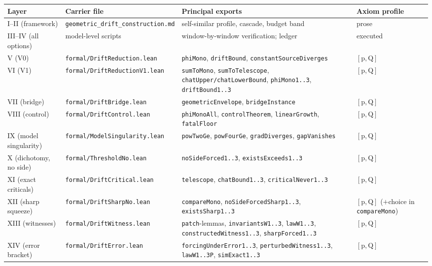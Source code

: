 \documentclass[11pt]{article}
\theoremstyle{plain}
\theoremstyle{definition}
\begin{document}
\begin{longtable}{p{} p{} p{} p{}}
\hline
\textbf{Layer} & \textbf{Carrier file} & \textbf{Principal exports} & \textbf{Axiom profile}\\
\hline
\endhead
I--II (framework) & \texttt{geometric\_drift\_construction.md} & self-similar profile, cascade, budget band & prose\\
\hline
III--IV (all options) & model-level scripts & window-by-window verification; ledger & executed\\
\hline
V (V0) & \texttt{formal/DriftReduction.lean} & \texttt{phiMono}, \texttt{driftBound}, \texttt{constantSourceDiverges} & $[\mathrm{p},\mathrm{Q}]$\\
\hline
VI (V1) & \texttt{formal/DriftReductionV1.lean} & \texttt{sumToMono}, \texttt{sumToTelescope}, \texttt{chatUpper/\allowbreak chatLowerBound}, \texttt{phiMono1..3}, \texttt{driftBound1..3} & $[\mathrm{p},\mathrm{Q}]$\\
\hline
VII (bridge) & \texttt{formal/DriftBridge.lean} & \texttt{geometricEnvelope}, \texttt{bridgeInstance} & $[\mathrm{p},\mathrm{Q}]$\\
\hline
VIII (control) & \texttt{formal/DriftControl.lean} & \texttt{phiMonoAll}, \texttt{controlTheorem}, \texttt{linearGrowth}, \texttt{fatalFloor} & $[\mathrm{p},\mathrm{Q}]$\\
\hline
IX (model singularity) & \texttt{formal/ModelSingularity.lean} & \texttt{powTwoGe}, \texttt{powFourGe}, \texttt{gradDiverges}, \texttt{gapVanishes} & $[\mathrm{p},\mathrm{Q}]$\\
\hline
X (dichotomy, no side) & \texttt{formal/ThresholdNo.lean} & \texttt{noSideForced1..3}, \texttt{existsExceeds1..3} & $[\mathrm{p},\mathrm{Q}]$\\
\hline
XI (exact criticals) & \texttt{formal/DriftCritical.lean} & \texttt{telescope}, \texttt{chatBound1..3}, \texttt{criticalNever1..3} & $[\mathrm{p},\mathrm{Q}]$\\
\hline
XII (sharp squeeze) & \texttt{formal/DriftSharpNo.lean} & \texttt{compareMono}, \texttt{noSideForced\allowbreak Sharp1..3}, \texttt{existsSharp1..3} & $[\mathrm{p},\mathrm{Q}]$ ($+$choice in \texttt{compareMono})\\
\hline
XIII (witnesses) & \texttt{formal/DriftWitness.lean} & \texttt{patch}-lemmas, \texttt{invariantsW1..3}, \texttt{lawW1..3}, \texttt{constructed\allowbreak Witness1..3}, \texttt{sharpForced1..3} & $[\mathrm{p},\mathrm{Q}]$\\
\hline
XIV (error bracket) & \texttt{formal/DriftError.lean} & \texttt{forcingUnderError1..3}, \texttt{perturbedWitness1..3}, \texttt{lawW1..3P}, \texttt{simExact1..3} & $[\mathrm{p},\mathrm{Q}]$\\
\hline
\end{longtable}
\end{document}
